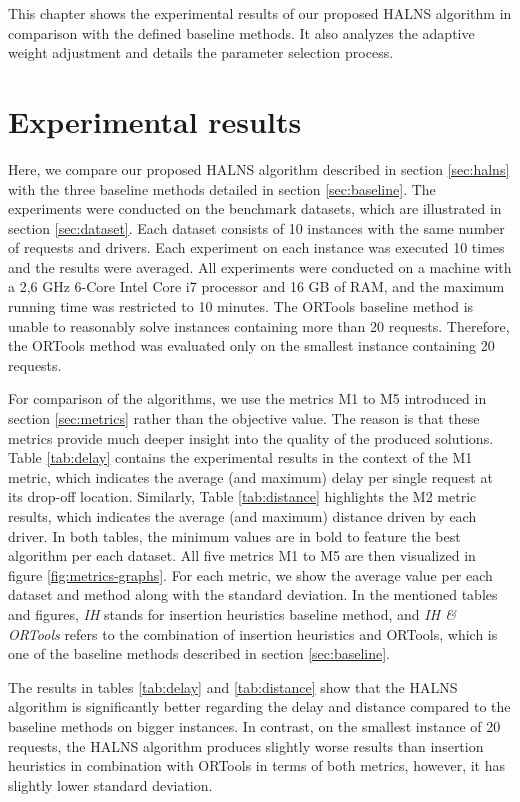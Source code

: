 This chapter shows the experimental results of our proposed HALNS algorithm in comparison with the defined baseline methods. It also analyzes the adaptive weight adjustment and details the parameter selection process.

\section{Experimental results}

    Here, we compare our proposed HALNS algorithm described in section \ref{sec:halns} with the three baseline methods detailed in section \ref{sec:baseline}. The experiments were conducted on the benchmark datasets, which are illustrated in section \ref{sec:dataset}. Each dataset consists of 10 instances with the same number of requests and drivers. Each experiment on each instance was executed 10 times and the results were averaged. All experiments were conducted on a machine with a 2,6 GHz 6-Core Intel Core i7 processor and 16 GB of RAM, and the maximum running time was restricted to 10 minutes. The ORTools baseline method is unable to reasonably solve instances containing more than 20 requests. Therefore, the ORTools method was evaluated only on the smallest instance containing 20 requests.
    
    For comparison of the algorithms, we use the metrics M1 to M5 introduced in section \ref{sec:metrics} rather than the objective value. The reason is that these metrics provide much deeper insight into the quality of the produced solutions. Table \ref{tab:delay} contains the experimental results in the context of the M1 metric, which indicates the average (and maximum) delay per single request at its drop-off location. Similarly, Table \ref{tab:distance} highlights the M2 metric results, which indicates the average (and maximum) distance driven by each driver. In both tables, the minimum values are in bold to feature the best algorithm per each dataset. All five metrics M1 to M5 are then visualized in figure \ref{fig:metrics-graphs}. For each metric, we show the average value per each dataset and method along with the standard deviation. In the mentioned tables and figures, \emph{IH} stands for insertion heuristics baseline method, and \emph{IH \& ORTools} refers to the combination of insertion heuristics and ORTools, which is one of the baseline methods described in section \ref{sec:baseline}.

    The results in tables \ref{tab:delay} and \ref{tab:distance} show that the HALNS algorithm is significantly better regarding the delay and distance compared to the baseline methods on bigger instances. In contrast, on the smallest instance of 20 requests, the HALNS algorithm produces slightly worse results than insertion heuristics in combination with ORTools in terms of both metrics, however, it has slightly lower standard deviation.
    
